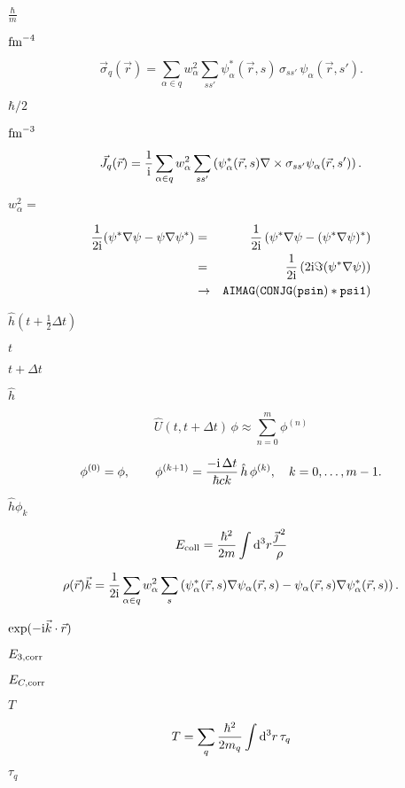 \documentclass{article}
\begin{document}
$ \frac{\hbar}{m} $
\pagebreak

$ {\rm fm}^{-4} $
\pagebreak

\[ \vec\sigma_q(\vec r)=\sum_{\alpha\in q} w_\alpha^2 \sum_{ss'}\psi_\alpha^*(\vec r,s)\,\sigma_{ss'} \,\psi_\alpha(\vec r,s').\]
\pagebreak

$ \hbar/2 $
\pagebreak

$ {\rm fm}^{-3} $
\pagebreak

\[ \vec J_q(\vec r)=\frac{1}{{\mathrm i}}\sum_{\alpha\in q}w_\alpha^2 \sum_{ss'}\left(\psi_\alpha^*(\vec r,s)\nabla\times\sigma_{ss'} \psi_\alpha(\vec r,s')\right).\]
\pagebreak

$ w_\alpha^2= $
\pagebreak

\begin{eqnarray*} \frac{1}{2{\mathrm i}}(\psi^*\nabla\psi-\psi\nabla\psi^*)&=& \frac{1}{2{\mathrm i}}\left(\psi^*\nabla\psi-(\psi^*\nabla\psi)^*\right)\\ &=&\frac{1}{2{\mathrm i}}\left(2{\mathrm i}\Im(\psi^*\nabla\psi)\right)\\ &\rightarrow&{\tt AIMAG(CONJG(psin)*psi1)} \end{eqnarray*}
\pagebreak

$ \hat h(t+\tfrac1{2}\Delta t) $
\pagebreak

$ t $
\pagebreak

$ t+\Delta t $
\pagebreak

$ \hat h $
\pagebreak

\[ \hat U(t,t+\Delta t)\,\phi\approx \sum_{n=0}^m \phi^{(n)} \]
\pagebreak

\[ \phi^{(0)}=\phi,\qquad \phi^{(k+1)}=\frac{-{\mathrm i}\,\Delta t} {\hbar c k}\,\hat h\,\phi^{(k)},\quad k=0,\ldots,m-1. \]
\pagebreak

$ \hat h\phi_k $
\pagebreak

\[ E_{\rm coll}=\frac{\hbar^2}{2m}\int {\mathrm d}^3r \frac{{\vec \jmath\,}^2}{\rho} \]
\pagebreak

\[ \rho(\vec r) \vec k=\frac{1}{2{\mathrm i}}\sum_{\alpha\in q}w_\alpha^2 \sum_s\left(\psi_\alpha^*(\vec r,s)\nabla\psi_\alpha(\vec r,s)-\psi_\alpha(\vec r,s) \nabla\psi_\alpha^*(\vec r,s)\right). \]
\pagebreak

$ \exp(-{\mathrm i}\vec k\cdot \vec r) $
\pagebreak

$ E_{3,\rm corr} $
\pagebreak

$ E_{C,\rm corr} $
\pagebreak

$ T $
\pagebreak

\[ T=\sum_q \frac{\hbar^2}{2m_q}\int{\mathrm d}^3 r\, \tau_q \]
\pagebreak

$ \tau_q $
\pagebreak
\end{document}
